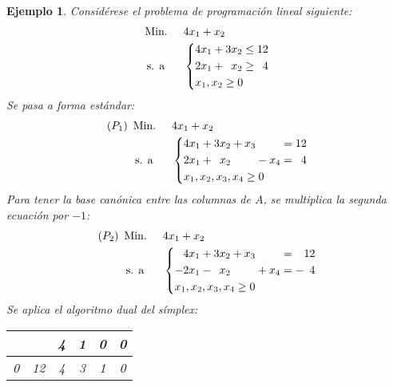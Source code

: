 \documentclass[11pt]{report}
\theoremstyle{mytheorem}
\theoremstyle{mydefinition}
\theoremstyle{myexample}
\newtheorem*{example}{Ejemplo}
\begin{document}
\begin{example}
Considérese el problema de programación lineal siguiente:
\[\begin{aligned}[t]
&\text{Min. } && 4x_1+x_2 \\
& \, \text{s. a} &&\left\{\begin{alignedat}{10}
&4&x_1 & {}+{} & 3&x_2 & {}\leq{} & 1&2 \\
&2&x_1 & {}+{} &  &x_2 & {}\geq{} &  &4  \\
&\mathrlap{x_1,x_2 \geq 0}
\end{alignedat}\right.
\end{aligned}\]
Se pasa a forma estándar:
\[\begin{aligned}[t]
(P_1)\ \, &\text{Min. } && 4x_1+x_2 \\
& \, \text{s. a} &&\left\{\begin{alignedat}{10}
&4&x_1 & {}+{} & 3&x_2 & {}+{} & x_3 &       &     & {}={} & 1&2 \\
&2&x_1 & {}+{} &  &x_2 &       &     & {}-{} & x_4 & {}={} &  &4  \\
&\mathrlap{x_1,x_2,x_3,x_4 \geq 0}
\end{alignedat}\right.
\end{aligned}\]
Para tener la base canónica entre las columnas de $A$, se multiplica la segunda ecuación por $-1$:
\[\begin{aligned}[t]
(P_2)\ \, &\text{Min. } && 4x_1+x_2 \\
& \, \text{s. a} &&\left\{\begin{alignedat}{10}
& &4x_1 & {}+{} & 3&x_2 & {}+{} & x_3 &       &     & {}={} &  &12 \\
&-&2x_1 & {}-{} &  &x_2 &       &     & {}+{} & x_4 & {}={} & -&4  \\
&\mathrlap{x_1,x_2,x_3,x_4 \geq 0}
\end{alignedat}\right.
\end{aligned}\]
Se aplica el algoritmo dual del símplex:
\begin{center}
\begin{tabular}{|c|c|c|c|c|c|}
    \cline{3-6}
    \multicolumn{1}{c}{} & \multicolumn{1}{c|}{} & \multicolumn{1}{c}{\phantom{-}4} & \multicolumn{1}{c}{\phantom{-}1} & \multicolumn{1}{c}{\phantom{-}0}  & \multicolumn{1}{c|}{\phantom{-}0} \\ \hline
    
    0 & \phantom{-}12 & \multicolumn{1}{c}{\phantom{-}4} & \multicolumn{1}{c}{\phantom{-}3} & \multicolumn{1}{c}{\phantom{-}1} & \multicolumn{1}{c|}{\phantom{-}0} \\
    

\end{tabular}
\end{center}
\end{example}
\end{document}
